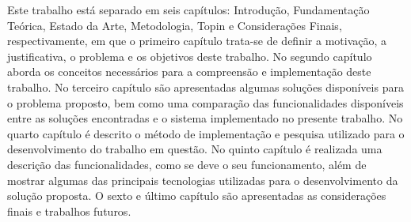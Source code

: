 Este trabalho está separado em seis capítulos: Introdução, Fundamentação Teórica, Estado da Arte, Metodologia,
Topin e Considerações Finais, respectivamente, em que o primeiro capítulo trata-se de definir a motivação, a
justificativa, o problema e os objetivos deste trabalho. No segundo capítulo aborda os conceitos necessários
para a compreensão e implementação deste trabalho. No terceiro capítulo são apresentadas algumas soluções
disponíveis para o problema proposto, bem como uma comparação das funcionalidades disponíveis entre as soluções
encontradas e o sistema implementado no presente trabalho. No quarto capítulo é descrito o método de implementação
e pesquisa utilizado para o desenvolvimento do trabalho em questão. No quinto capítulo é realizada uma descrição
das funcionalidades, como se deve o seu funcionamento, além de mostrar algumas das principais tecnologias
utilizadas para o desenvolvimento da solução proposta. O sexto e último capítulo são apresentadas as considerações
finais e trabalhos futuros.